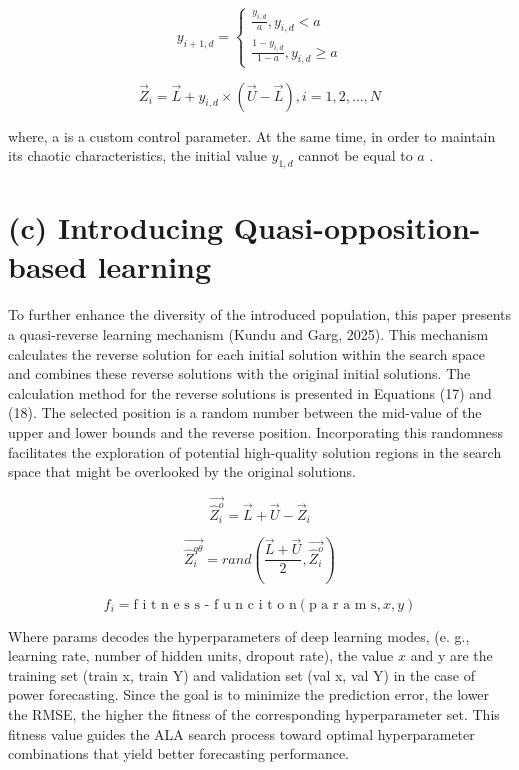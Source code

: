 \documentclass[
  10
]{article}
\begin{document}
\[
y _ {i + 1, d} = \left\{ \begin{array}{c} \frac {y _ {i , d}}{a}, y _ {i, d} <   a \\ \frac {1 - y _ {i , d}}{1 - a}, y _ {i, d} \geq a \end{array} \right. \tag {15}
\]

\[
\overrightarrow {Z} _ {i} = \overrightarrow {L} + y _ {i, d} \times (\overrightarrow {U} - \overrightarrow {L}), i = 1, 2, \dots , N \tag {16}
\]

where, a is a custom control parameter. At the same time, in order to
maintain its chaotic characteristics, the initial value
\(y _ { 1 , d }\) cannot be equal to \(a\) .

\section{(c) Introducing Quasi-opposition-based
learning}\label{c-introducing-quasi-opposition-based-learning}

To further enhance the diversity of the introduced population, this
paper presents a quasi-reverse learning mechanism (Kundu and Garg,
2025). This mechanism calculates the reverse solution for each initial
solution within the search space and combines these reverse solutions
with the original initial solutions. The calculation method for the
reverse solutions is presented in Equations (17) and (18). The selected
position is a random number between the mid-value of the upper and lower
bounds and the reverse position. Incorporating this randomness
facilitates the exploration of potential high-quality solution regions
in the search space that might be overlooked by the original solutions.

\[
\overrightarrow {\widehat {Z} _ {i} ^ {o}} = \overrightarrow {L} + \overrightarrow {U} - \overrightarrow {Z} _ {i} \tag {17}
\]

\[
\overrightarrow {\widehat {Z} _ {i} ^ {q \theta}} = r a n d \left(\frac {\overrightarrow {L} + \overrightarrow {U}}{2}, \overrightarrow {\widehat {Z} _ {i} ^ {o}}\right) \tag {18}
\]

\[
f _ {i} = \text {f i t n e s s - f u n c i t o n} (\text {p a r a m s}, x, y) \tag {20}
\]

Where params decodes the hyperparameters of deep learning modes, (e. g.,
learning rate, number of hidden units, dropout rate), the value \(x\)
and y are the training set (train x, train Y) and validation set (val x,
val Y) in the case of power forecasting. Since the goal is to minimize
the prediction error, the lower the RMSE, the higher the fitness of the
corresponding hyperparameter set. This fitness value guides the ALA
search process toward optimal hyperparameter combinations that yield
better forecasting performance.
\end{document}
